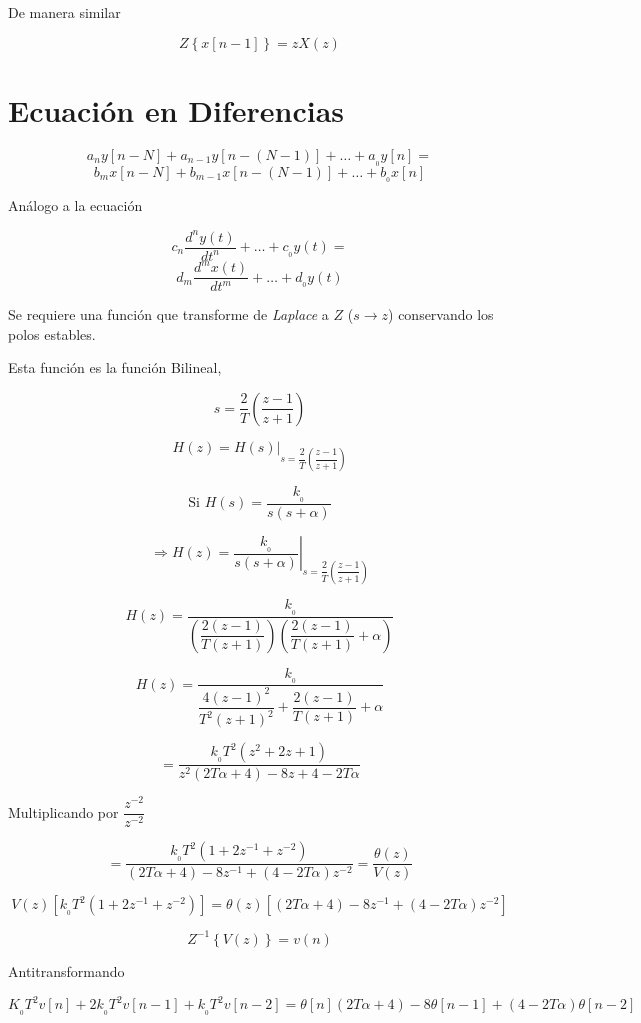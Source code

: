 De manera similar

$$Z\left\lbrace x[n - 1] \right\rbrace = zX(z)$$


\section{Ecuación en Diferencias}

$$a_{n}y[n - N] + a_{n - 1}y[n - (N - 1)] + \ldots + a_{_0}y[n] = $$
$$b_{m}x[n - N] + b_{m - 1}x[n - (N - 1)] + \ldots + b_{_0}x[n]$$
 
Análogo a la ecuación

$$c_{n} \dfrac{d^{n} y(t)}{dt^{n}} + \ldots + c_{_0}y(t) = $$
$$d_{m} \dfrac{d^{m} x(t)}{dt^{m}} + \ldots + d_{_0}y(t)$$


Se requiere una función que transforme de \textit{Laplace} a $Z$ ($s \rightarrow z$) conservando los polos estables.

Esta función es la función Bilineal,

$$s = \dfrac{2}{T} \left( \dfrac{z - 1}{z + 1} \right)$$

$$H(z) = \left. H(s) \right|_{s = \dfrac{2}{T} \left( \dfrac{z - 1}{z + 1} \right)}$$

$$\mbox{Si } H(s) = \dfrac{k_{_0}}{s(s + \alpha)}$$

$$\Rightarrow H(z) = \left. \dfrac{k_{_0}}{s(s + \alpha)} \right|_{s = \dfrac{2}{T} \left( \dfrac{z - 1}{z + 1} \right)}$$

$$H(z) = \dfrac{k_{_0}}{\left( \dfrac{2(z - 1)}{T(z + 1)} \right) \left( \dfrac{2(z - 1)}{T(z + 1)}  + \alpha \right)}$$

$$H(z) = \dfrac{k_{_0}}{\dfrac{4(z - 1)^{2}}{T^{2}(z + 1)^{2}} + \dfrac{2(z - 1)}{T(z + 1)} + \alpha}$$

$$= \dfrac{k_{_0}T^{2}(z^{2} + 2z + 1)}{z^{2}(2T\alpha + 4) - 8z + 4 -2T\alpha}$$

Multiplicando por $\dfrac{z^{-2}}{z^{-2}}$

$$= \dfrac{k_{_0}T^{2}(1 + 2z^{-1} + z^{-2})}{(2T\alpha + 4) - 8z^{-1} + (4 - 2T\alpha)z^{-2}} = \dfrac{\theta (z)}{V(z)}$$

$$V(z)\left[ k_{_0}T^{2}(1 + 2z^{-1} + z^{-2}) \right] = \theta(z) \left[ (2T\alpha + 4) - 8z^{-1} + (4 - 2T\alpha)z^{-2} \right]$$

$$Z^{-1} \left\lbrace  V(z) \right\rbrace = v(n)$$

Antitransformando

$$K_{_0}T^{2}v[n] + 2k_{_0}T^{2}v[n - 1] + k_{_0}T^{2}v[n -2] = \theta[n] (2T\alpha + 4) - 8\theta[n - 1] + (4 - 2T\alpha)\theta[n - 2]$$



